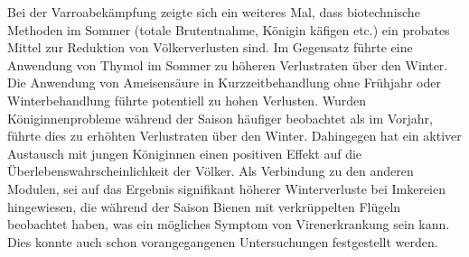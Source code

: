 \newline
Bei der Varroabekämpfung zeigte sich ein weiteres Mal, dass biotechnische Methoden im Sommer (totale Brutentnahme, Königin käfigen etc.) ein probates Mittel zur Reduktion von Völkerverlusten sind. Im Gegensatz führte eine Anwendung von Thymol im Sommer zu höheren Verlustraten über den Winter. Die Anwendung von Ameisensäure in Kurzzeitbehandlung ohne Frühjahr oder Winterbehandlung führte potentiell zu hohen Verlusten.
\newline
Wurden Königinnenprobleme während der Saison häufiger beobachtet als im Vorjahr, führte dies zu erhöhten Verlustraten über den Winter. Dahingegen hat ein aktiver Austausch mit jungen Königinnen einen positiven Effekt auf die Überlebenswahrscheinlichkeit der Völker.
\newline
Als Verbindung zu den anderen Modulen, sei auf das Ergebnis signifikant höherer Winterverluste bei Imkereien hingewiesen, die während der Saison Bienen mit verkrüppelten Flügeln beobachtet haben, was ein mögliches Symptom von Virenerkrankung sein kann. Dies konnte auch schon vorangegangenen Untersuchungen festgestellt werden.